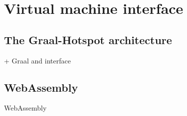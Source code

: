 \documentclass[a4paper,12pt,twoside]{../includes/ThesisStyle}
\begin{document}
\section{Virtual machine interface}

\subsection{The Graal-Hotspot architecture}

+ Graal and interface

\subsection{WebAssembly}

WebAssembly 







\end{document}
